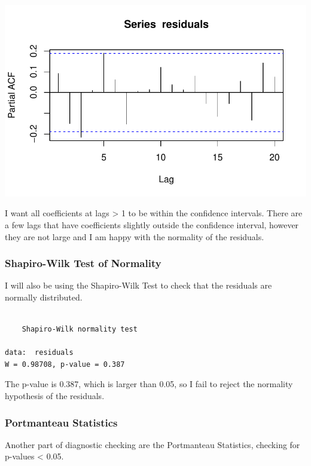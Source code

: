 \documentclass[
  letterpaper,
  DIV=11,
  numbers=noendperiod]{scrartcl}
\begin{document}
\includegraphics{Final_Project_files/figure-pdf/unnamed-chunk-31-2.pdf}

I want all coefficients at lags \textgreater{} 1 to be within the
confidence intervals. There are a few lags that have coefficients
slightly outside the confidence interval, however they are not large and
I am happy with the normality of the residuals.

\hypertarget{shapiro-wilk-test-of-normality}{%
\subsubsection{Shapiro-Wilk Test of
Normality}\label{shapiro-wilk-test-of-normality}}

I will also be using the Shapiro-Wilk Test to check that the residuals
are normally distributed.

\begin{verbatim}

    Shapiro-Wilk normality test

data:  residuals
W = 0.98708, p-value = 0.387
\end{verbatim}

The p-value is 0.387, which is larger than 0.05, so I fail to reject the
normality hypothesis of the residuals.

\hypertarget{portmanteau-statistics}{%
\subsubsection{Portmanteau Statistics}\label{portmanteau-statistics}}

Another part of diagnostic checking are the Portmanteau Statistics,
checking for p-values \textless{} 0.05.
\end{document}
